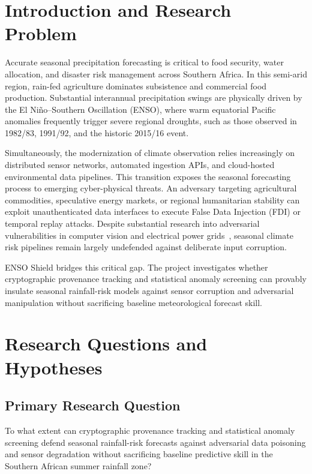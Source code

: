 \documentclass[runningheads]{llncs}
\begin{document}
\section{Introduction and Research Problem}
Accurate seasonal precipitation forecasting is critical to food security, water allocation, and disaster risk management across Southern Africa. In this semi-arid region, rain-fed agriculture dominates subsistence and commercial food production. Substantial interannual precipitation swings are physically driven by the El Ni\~no--Southern Oscillation (ENSO), where warm equatorial Pacific anomalies frequently trigger severe regional droughts, such as those observed in 1982/83, 1991/92, and the historic 2015/16 event.

Simultaneously, the modernization of climate observation relies increasingly on distributed sensor networks, automated ingestion APIs, and cloud-hosted environmental data pipelines. This transition exposes the seasonal forecasting process to emerging cyber-physical threats. An adversary targeting agricultural commodities, speculative energy markets, or regional humanitarian stability can exploit unauthenticated data interfaces to execute False Data Injection (FDI) or temporal replay attacks. Despite substantial research into adversarial vulnerabilities in computer vision and electrical power grids~\cite{biggio2018wild,barreno2010security}, seasonal climate risk pipelines remain largely undefended against deliberate input corruption.

ENSO Shield bridges this critical gap. The project investigates whether cryptographic provenance tracking and statistical anomaly screening can provably insulate seasonal rainfall-risk models against sensor corruption and adversarial manipulation without sacrificing baseline meteorological forecast skill.

\section{Research Questions and Hypotheses}
\subsection{Primary Research Question}
To what extent can cryptographic provenance tracking and statistical anomaly screening defend seasonal rainfall-risk forecasts against adversarial data poisoning and sensor degradation without sacrificing baseline predictive skill in the Southern African summer rainfall zone?
\end{document}
